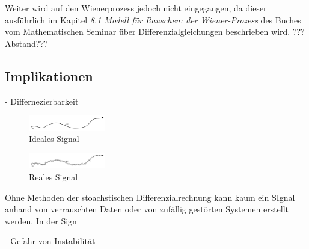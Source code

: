 Weiter wird auf den Wienerprozess jedoch nicht eingegangen, da dieser ausführlich im Kapitel \glqq \textit{8.1 Modell für Rauschen: der Wiener-Prozess}\glqq{} des Buches vom Mathematischen Seminar über Differenzialgleichungen beschrieben wird. ???Abstand???


\subsection{Implikationen\label{brown:Rauschen:Implikationen}}

- Differnezierbarkeit
\begin{figure}
	\centering
	\includegraphics[width=0.3\textwidth]{papers/brown/images/idealSignal.png}
	\caption{Ideales Signal}
	\label{idealSignal}
\end{figure}
\begin{figure}
	\centering
	\includegraphics[width=0.3\textwidth]{papers/brown/images/realSignal.png}
	\caption{Reales Signal}
	\label{realSignal}
\end{figure}

Ohne Methoden der stoachstischen Differenzialrechnung kann kaum ein SIgnal anhand von verrauschten Daten oder von zufällig gestörten Systemen erstellt werden. In der Sign


- Gefahr von Instabilität